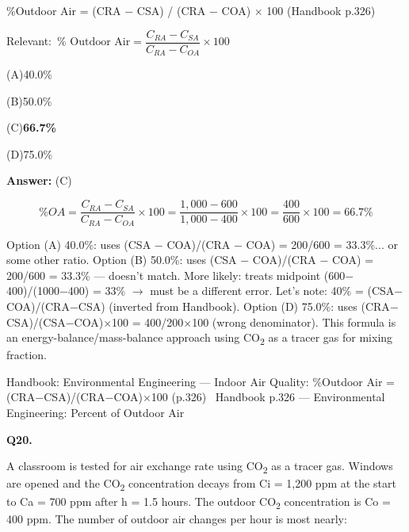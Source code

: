 \documentclass[11pt]{article}
\newcommand{\correct}[1]{\textbf{#1}\;{\color{accent}$\checkmark$}}
\newcommand{\optline}[2]{\par\noindent\hspace{1.2em}(#1)\hspace{0.6em}#2}
\begin{document}
\%Outdoor Air = (CRA $-$ CSA) / (CRA $-$ COA) $\times$ 100 (Handbook p.326)\par\vspace{3pt}
{\small\color{soft}Relevant:}\ $\% \text{ Outdoor Air} = \dfrac{C_{RA} - C_{SA}}{C_{RA} - C_{OA}} \times 100$\par\vspace{3pt}
\optline{A}{40.0\%}
\optline{B}{50.0\%}
\optline{C}{\correct{66.7\%}}
\optline{D}{75.0\%}
\par\vspace{3pt}
\vspace{2pt}\par\noindent\colorbox{boxbg}{\parbox{\dimexpr\linewidth-2\fboxsep\relax}{%
\vspace{2pt}\textbf{Answer:} (C)\par\vspace{2pt}
{\small \[\% OA = \frac{C_{RA} - C_{SA}}{C_{RA} - C_{OA}} \times 100 = \frac{1{,}000 - 600}{1{,}000 - 400} \times 100 = \frac{400}{600} \times 100 = 66.7\%\]

Option (A) 40.0\%: uses (CSA $-$ COA)/(CRA $-$ COA) = 200/600 = 33.3\%... or some other ratio. Option (B) 50.0\%: uses (CSA $-$ COA)/(CRA $-$ COA) = 200/600 = 33.3\% --- doesn't match. More likely: treats midpoint (600$-$400)/(1000$-$400) = 33\% $\rightarrow$ must be a different error. Let's note: 40\% = (CSA$-$COA)/(CRA$-$CSA) (inverted from Handbook). Option (D) 75.0\%: uses (CRA$-$CSA)/(CSA$-$COA)$\times$100 = 400/200$\times$100 (wrong denominator). This formula is an energy-balance/mass-balance approach using CO\textsubscript{2} as a tracer gas for mixing fraction.}\par\vspace{2pt}
{\footnotesize\color{soft}Handbook: Environmental Engineering --- Indoor Air Quality: \%Outdoor Air = (CRA$-$CSA)/(CRA$-$COA)$\times$100 (p.326) \textbullet\ Handbook p.326 --- Environmental Engineering: Percent of Outdoor Air}\vspace{2pt}
}}
\vspace{9pt}
\filbreak
\textbf{\color{accent}Q20.}\par\vspace{2pt}
A classroom is tested for air exchange rate using CO\textsubscript{2} as a tracer gas. Windows are opened and the CO\textsubscript{2} concentration decays from Ci = 1,200 ppm at the start to Ca = 700 ppm after h = 1.5 hours. The outdoor CO\textsubscript{2} concentration is Co = 400 ppm. The number of outdoor air changes per hour is most nearly:
\end{document}
